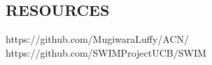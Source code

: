 \documentclass[portrait,a1]{a0poster}
\begin{document}
\begin{multicols}{2}

\color{SaddleBrown} %



\color{DarkSlateGray} %





\color{SaddleBrown}
\section*{RESOURCES}
\color{DarkSlateGray}
https://github.com/MugiwaraLuffy/ACN/ \\
https://github.com/SWIMProjectUCB/SWIM





\end{multicols}
\end{document}
